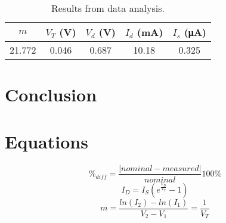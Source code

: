 \documentclass{article}
\begin{document}
\begin{table}[h!]
  \centering
  \begin{tabular}{ccccc}
    $m$ & $V_T$ (\si{V}) & $V_d$ (\si{V}) & $I_d$ (\si{mA}) & $I_s$ (\si{\micro\ampere}) \\
    \hline
    21.772 & 0.046 & 0.687 & 10.18 & 0.325 \\
  \end{tabular}
  \caption{\label{tab:analysis} Results from data analysis.}
\end{table}

\section{Conclusion}
\label{sec:conclusion}


\section{Equations}
\label{sec:equations}

%
\begin{equation}
  \label{eq:percent_diff}
  \%_{diff} = \frac{|nominal - measured|}{nominal}100\%
\end{equation}
%
\begin{equation}
  \label{eq:schockley}
  I_D = I_S \left(e^{\frac{V_D}{V_T}} - 1\right)
\end{equation}
%
  \begin{equation}
  \label{eq:m}
    m = \frac{ln(I_2)-ln(I_1)}{V_2-V_1} = \frac{1}{V_T}
\end{equation}
\end{document}
